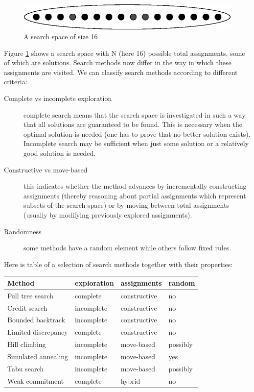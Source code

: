 \begin{figure}
\begin{center}
\includegraphics{search3.eps}
\end{center}
\caption{A search space of size 16}
\label{figsearchspace}
\end{figure}
Figure \ref{figsearchspace} shows a search space with N (here 16)
possible total assignments, some of which are solutions.
Search methods now differ in the way in which these assignments
are visited.
We can classify search methods according to different criteria:
\begin{description}
\item[Complete vs incomplete exploration] complete search means that the search space
    is investigated in such a way that all solutions are guaranteed to be found.
    This is necessary when the optimal solution is needed (one has to prove
    that no better solution exists). Incomplete search may be sufficient when
    just some solution or a relatively good solution is needed.
\item[Constructive vs move-based] this indicates whether the method advances
    by incrementally constructing assignments (thereby reasoning about partial
    assignments which represent subsets of the search space) or by moving
    between total assignments (usually by modifying previously explored
    assignments).
\item[Randomness] some methods have a random element while others follow
    fixed rules.
\end{description}
Here is table of a selection of search methods together with their properties:

\begin{center}
\begin{tabular}{|l|lll|}
\hline
Method&                 exploration&    assignments&    random\\
\hline
Full tree search&       complete&       constructive&   no\\
Credit search&          incomplete&     constructive&   no\\
Bounded backtrack&      incomplete&     constructive&   no\\
Limited discrepancy&    complete&       constructive&   no\\
Hill climbing&          incomplete&     move-based&     possibly\\
Simulated annealing&    incomplete&     move-based&     yes\\
Tabu search&            incomplete&     move-based&     possibly\\
Weak commitment&        complete&       hybrid&         no\\
\hline
\end{tabular}
\end{center}

